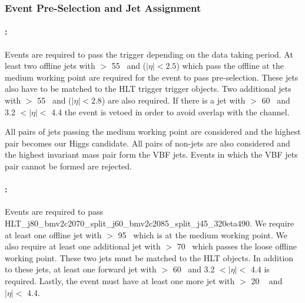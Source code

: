 \subsubsection{Event Pre-Selection and Jet Assignment}
\label{sec:vbf-presel}

\paragraph{\fourcentral:} Events are required to pass the \fourcentral trigger depending on the data taking period. At least two offline jets with \pT $>$ 55 \GeV~and ($|\eta| < 2.5$) which pass the offline \btagging at the medium working point are required for the event to pass pre-selection.  These jets also have to be matched to the HLT trigger \btagged trigger objects. Two additional jets with \pT $>$ 55 \GeV~and  ($|\eta| < 2.8$) are also required. If there is a jet with \pT $>$ 60 \GeV~and 3.2 $< |\eta| <$ 4.4 the event is vetoed in order to avoid overlap with the \twocentral channel.

All pairs of \btagged jets passing the medium working point are considered and the highest \pT  pair becomes our Higgs candidate.  All pairs of non-\btagged jets are also considered and the highest invariant mass pair form the VBF jets. Events in which the VBF jets pair cannot be formed are rejected.


\paragraph{\twocentral:} Events are required to pass HLT\_j80\_bmv2c2070\_split\_j60\_bmv2c2085\_split\_j45\_320eta490.   We require at least one offline jet with \pT $>$ 95 \GeV~which is \btagged at the medium working point.  We also require at least one additional jet with \pT $>$ 70 \GeV~which passes the loose offline \btagging working point.  These two jets must be matched to the HLT \btagged objects.  In addition to these jets, at least one forward jet with \pT $>$ 60 \GeV~and 3.2 $< |\eta| <$ 4.4 is required.  Lastly, the event must have at least one more jet with \pT $>$ 20 \GeV~ and $|\eta| <$ 4.4.  

